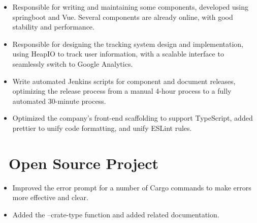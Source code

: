 \documentclass{resume}
\newcommand{\en}[1]{#1}
\newcommand{\zh}[1]{}
\begin{document}
\en{}
\zh{\datedsubsection{\textbf{\href{https://www.morningstar.com/}{晨星资讯（Morningstar, Inc. ）}}}{2019/06 -- 2020/07}}
\en{}
\zh{\role{前后端开发工程师}{组件开发}}
\begin{itemize}
      \item \en{Responsible for writing and maintaining some components, developed using springboot and Vue. Several components are already online, with good stability and performance.}
            \zh{负责独立组件的编写和维护，使用 springboot 和 Vue 开发。多个组件已经上线使用，有较好的稳定性和性能。}
      \item \en{Responsible for designing the tracking system design and implementation, using HeapIO to track user information, with a scalable interface to seamlessly switch to Google Analytics.}
            \zh{负责设计和实现前端 tracking 系统，使用 HeapIO 追踪用户信息，并预留可扩展接口，可无缝切换至 Google Analytics。}
      \item \en{Write automated Jenkins scripts for component and document releases, optimizing the release process from a manual 4-hour process to a fully automated 30-minute process.}
            \zh{为组件和文档发布编写自动化 Jenkins 脚本，将发布流程从手动 4 小时优化到全自动 30 分钟。}
      \item \en{Optimized the company's front-end scaffolding to support TypeScript, added prettier to unify code formatting, and unify ESLint rules.}
            \zh{优化公司前端脚手架，使其支持 TypeScript，添加 prettier 统一代码格式，优化统一 ESLint 规则。}
\end{itemize}

\section{\faGithubAlt\ \en{Open Source Project}\zh{开源项目}}
\en{}
\zh{\role{活跃贡献者}{\href{https://github.com/rust-lang/cargo/commits?author=hi-rustin}{136+ 个提交}}}
\begin{itemize}
      \item \en{Improved the error prompt for a number of Cargo commands to make errors more effective and clear.}
            \zh{改善了大量 Cargo 命令的错误提示，让错误更有效更清晰。}
      \item \en{Added the --crate-type function and added related documentation.}
            \zh{添加了 --crate-type 功能并添加相关文档。}
\end{itemize}
\end{document}
